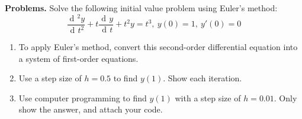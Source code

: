 \documentclass[10pt]{article}
\title{}
\date{}
\DeclareMathOperator{\xd}{d\!}
\begin{document}
\noindent
{\bf Problems.}
Solve the following initial value problem using Euler's method:
\begin{equation*}
\frac{\xd{}^2y}{\xd t^2} + t\frac{\xd y}{\xd t} + t^2y = t^3, \ y(0) = 1, \ y'(0) = 0
\end{equation*}



\begin{enumerate}
    \item To apply Euler's method, convert this second-order differential equation into a system of first-order equations.
    \item Use a step size of $h = 0.5$ to find $y(1)$. Show each iteration.
    \item Use computer programming to find $y(1)$ with a step size of $h = 0.01$. Only show the answer, and attach your code.
\end{enumerate}
\end{document}
